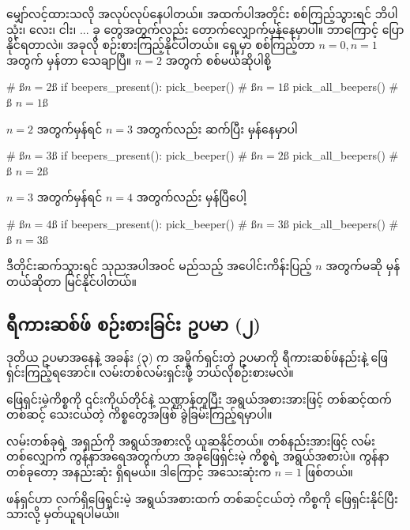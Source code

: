 မျှော်လင့်ထားသလို အလုပ်လုပ်နေပါတယ်။ အထက်ပါအတိုင်း စစ်ကြည့်သွားရင် ဘိပါ သုံး၊ လေး၊ ငါး၊ $...$ ခု တွေအတွက်လည်း တောက်လျှောက်မှန်နေမှာပါ။ ဘာကြောင့် ပြောနိုင်ရတာလဲ။ အခုလို စဉ်းစားကြည့်နိုင်ပါတယ်။ ရှေ့မှာ စစ်ကြည့်တာ $n = 0, n = 1$ အတွက် မှန်တာ သေချာပြီ။  $n = 2$ အတွက် စစ်မယ်ဆိုပါစို့
%
\begin{py}
# ß$n = 2$ß
if beepers_present():
    pick_beeper() # ß$n = 1$ß
    pick_all_beepers() # ß $n = 1$ß
\end{py}
%
$n = 2$ အတွက်မှန်ရင် $n = 3$ အတွက်လည်း ဆက်ပြီး မှန်နေမှာပါ
%
\begin{py}
# ß$n = 3$ß
if beepers_present():
    pick_beeper() # ß$n = 2$ß
    pick_all_beepers() # ß $n = 2$ß
\end{py}
%
$n = 3$ အတွက်မှန်ရင် $n = 4$ အတွက်လည်း မှန်ပြီပေါ့
%
\begin{py}
# ß$n = 4$ß
if beepers_present():
    pick_beeper() # ß$n = 3$ß
    pick_all_beepers() # ß $n = 3$ß
\end{py}
%
ဒီတိုင်းဆက်သွားရင် သုညအပါအဝင် မည်သည့် အပေါင်းကိန်းပြည့် $n$ အတွက်မဆို   မှန်တယ်ဆိုတာ မြင်နိုင်ပါတယ်။












\subsection*{ရီကားဆစ်ဖ် စဉ်းစားခြင်း ဥပမာ (၂)}
ဒုတိယ ဥပမာအနေနဲ့ အခန်း (၃) က အမှိုက်ရှင်းတဲ့ ဥပမာကို ရီကားဆစ်ဖ်နည်းနဲ့ ဖြေရှင်းကြည့်ရအောင်။ လမ်းတစ်လမ်းရှင်းဖို့ ဘယ်လိုစဉ်းစားမလဲ။
\begin{mytcbox}
ဖြေရှင်းမဲ့ကိစ္စကို ၎င်းကိုယ်တိုင်နဲ့ သဏ္ဌာန်တူပြီး အရွယ်အစားအားဖြင့် တစ်ဆင့်ထက်တစ်ဆင့် သေးငယ်တဲ့ ကိစ္စတွေအဖြစ် ခွဲခြမ်းကြည့်ရမှာပါ။
\end{mytcbox}%

လမ်းတစ်ခုရဲ့ အရှည်ကို အရွယ်အစားလို့ ယူဆနိုင်တယ်။ တစ်နည်းအားဖြင့် လမ်းတစ်လျှောက် ကွန်နာအရေအတွက်ဟာ အခုဖြေရှင်းမဲ့ ကိစ္စရဲ့ အရွယ်အစားပဲ။ ကွန်နာတစ်ခုတော့ အနည်းဆုံး ရှိရမယ်။ ဒါကြောင့် အသေးဆုံးက $n = 1$ ဖြစ်တယ်။

\begin{mytcbox}
 ဖန်ရှင်ဟာ လက်ရှိဖြေရှင်းမဲ့ အရွယ်အစားထက် တစ်ဆင့်ငယ်တဲ့ ကိစ္စကို ဖြေရှင်းနိုင်ပြီးသားလို့ မှတ်ယူရပါမယ်။ 
\end{mytcbox}%

